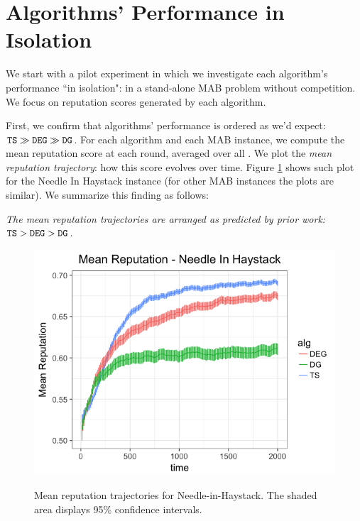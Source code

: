 \documentclass[../competing_bandits.tex]{subfiles}
\begin{document}
\section{Algorithms' Performance in Isolation}\label{section:4}

We start with a pilot experiment in which we investigate each algorithm's performance ``in isolation": in a stand-alone MAB problem without competition. We focus on reputation scores generated by each algorithm.

First, we confirm that algorithms' performance is ordered as we'd expect:
    $\mathtt{TS} \gg \mathtt{DEG} \gg \mathtt{DG}$.
For each algorithm and each MAB instance, we compute the mean reputation score at each round, averaged over all \MRVs. We plot the \emph{mean reputation trajectory}: how this score evolves over time. Figure \ref{prelim_means} shows such  plot for the Needle In Haystack instance (for other MAB instances the plots are similar). We summarize this finding as follows:

\begin{finding}
\textit{The mean reputation trajectories are arranged as predicted by prior work:
    $\mathtt{TS} > \mathtt{DEG} > \mathtt{DG}$.}
\end{finding}


\begin{figure}
\caption{Mean reputation trajectories for Needle-in-Haystack. The shaded area displays 95\% confidence intervals.}
\includegraphics[scale=0.35]{figures/nih_iso_mean}
\label{prelim_means}
\end{figure}
\end{document}

